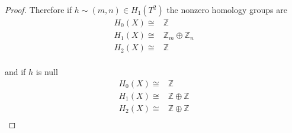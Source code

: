 \documentclass[10pt]{article}
\newcommand{\bb}[1]{\mathbb{#1}}
\theoremstyle{plain}
\theoremstyle{remark}
\begin{document}
\begin{proof}
  Therefore if $h\sim (m,n)\in H_1(T^2)$ the nonzero homology groups are
  \[
    \begin{array}{cl}
      H_0(X) \cong& \bb{Z}\\
      H_1(X) \cong& \bb{Z}_m\oplus \bb{Z}_n\\
      H_2(X) \cong& \bb{Z}\\
    \end{array}
  \]

  and if $h$ is null
  \[
    \begin{array}{cl}
      H_0(X) \cong& \bb{Z}\\
      H_1(X) \cong& \bb{Z}\oplus \bb{Z}\\
      H_2(X) \cong& \bb{Z}\oplus \bb{Z}\\
    \end{array}
  \]
\end{proof}


\end{document}
